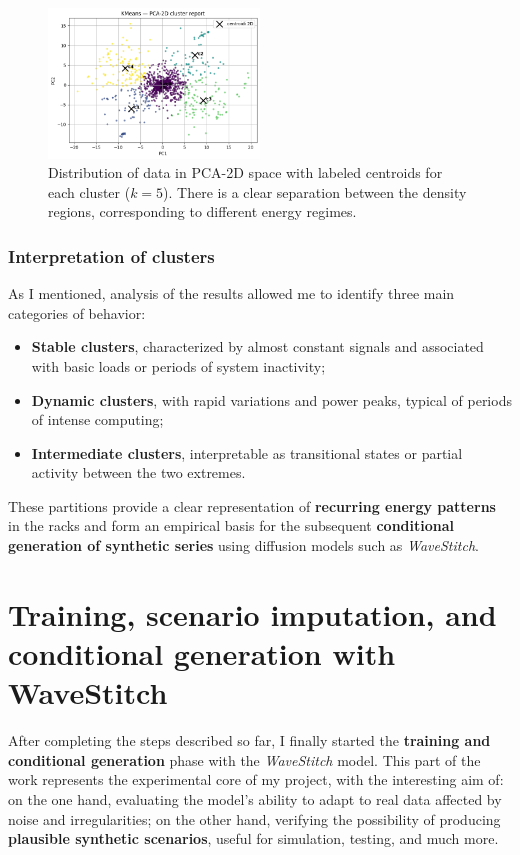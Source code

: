 \begin{figure}[H]
\centering
\includegraphics[width=0.50\textwidth]{images/pca2d_cluster_report.png}
\caption{Distribution of data in PCA-2D space with labeled centroids for each cluster ($k=5$).  
There is a clear separation between the density regions, corresponding to different energy regimes.}
\label{fig:pca2d_cluster_report}
\end{figure}

\subsubsection{Interpretation of clusters}

As I mentioned, analysis of the results allowed me to identify three main categories of behavior:
\begin{itemize}
  \item \textbf{Stable clusters}, characterized by almost constant signals and associated with basic loads or periods of system inactivity;
  \item \textbf{Dynamic clusters}, with rapid variations and power peaks, typical of periods of intense computing;
  \item \textbf{Intermediate clusters}, interpretable as transitional states or partial activity between the two extremes.
\end{itemize}

These partitions provide a clear representation of \textbf{recurring energy patterns} in the racks and form an empirical basis for the subsequent \textbf{conditional generation of synthetic series} using diffusion models such as \emph{WaveStitch}.


\section{Training, scenario imputation, and conditional generation with WaveStitch}

After completing the steps described so far, I finally started the \textbf{training and conditional generation} phase with the \emph{WaveStitch} model.  
This part of the work represents the experimental core of my project, with the interesting aim of: on the one hand, evaluating the model's ability to adapt to real data affected by noise and irregularities; on the other hand, verifying the possibility of producing \textbf{plausible synthetic scenarios}, useful for simulation, testing, and much more.

